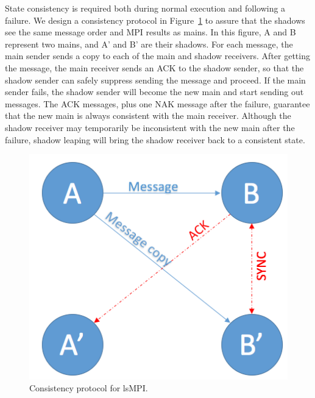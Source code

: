 State consistency is required both during normal execution and following a failure. %
We design a consistency protocol in Figure~\ref{fig:cons_protocol} to assure 
that the shadows see the same message order and MPI results as mains. In this figure, A and B represent two mains, and A' and B' are their shadows. For each message, the main sender sends a copy to each of the main and shadow receivers. After getting the message, the main receiver sends an ACK to the shadow sender, so that the shadow sender can safely suppress sending the message and proceed. If the main sender fails,
the shadow sender will become the new main and start sending out messages. The ACK messages, plus one NAK message after the failure, guarantee that the new main is always consistent with the main receiver. 
Although the shadow receiver may temporarily be inconsistent with the new main after the failure, shadow leaping will bring the shadow receiver back to a consistent state.

\begin{figure}[!t]
  \begin{center}
      \includegraphics[width=0.7\columnwidth]{Figures/cons_protocol}
  \end{center}
  \caption{Consistency protocol for lsMPI.}
  \label{fig:cons_protocol}
\end{figure}

